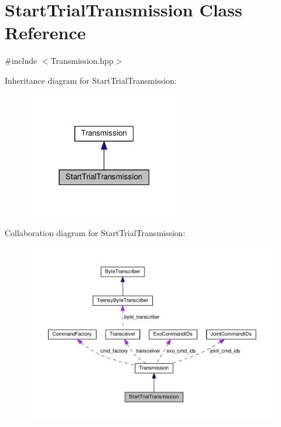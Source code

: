 \hypertarget{classStartTrialTransmission}{}\section{Start\+Trial\+Transmission Class Reference}
\label{classStartTrialTransmission}


{\ttfamily \#include $<$Transmission.\+hpp$>$}



Inheritance diagram for Start\+Trial\+Transmission\+:\nopagebreak
\begin{figure}[H]
\begin{center}
\leavevmode
\includegraphics[width=195pt]{classStartTrialTransmission__inherit__graph}
\end{center}
\end{figure}


Collaboration diagram for Start\+Trial\+Transmission\+:\nopagebreak
\begin{figure}[H]
\begin{center}
\leavevmode
\includegraphics[width=350pt]{classStartTrialTransmission__coll__graph}
\end{center}
\end{figure}

